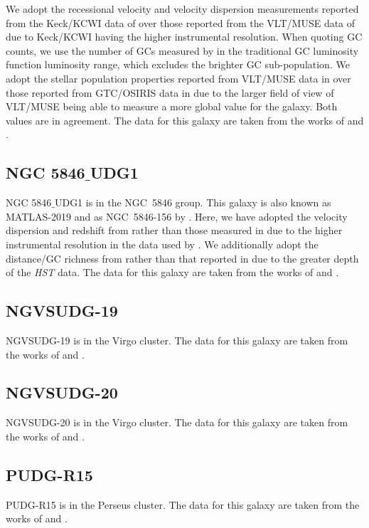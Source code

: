 We adopt the recessional velocity and velocity dispersion measurements reported from the Keck/KCWI data of \citet{Danieli2019} over those reported from the VLT/MUSE data of \citet{Emsellem2019} due to Keck/KCWI having the higher instrumental resolution. When quoting GC counts, we use the number of GCs measured by \citet{Shen2021} in the traditional GC luminosity function luminosity range, which excludes the brighter GC sub-population. We adopt the stellar population properties reported from VLT/MUSE data in \citet{Fensch2019} over those reported from GTC/OSIRIS data in \citet{RuizLara2019} due to the larger field of view of VLT/MUSE being able to measure a more global value for the galaxy. Both values are in agreement. The data for this galaxy are taken from the works of \citet{vanDokkum2018, Fensch2019, Danieli2019, Shen2021} and \citet{Shen2023}.

\subsection{NGC 5846$\_$UDG1}
NGC 5846$\_$UDG1 is in the NGC~5846 group. This galaxy is also known as MATLAS-2019 \citep{Muller2020} and as NGC~5846-156 by \citet{Mahdavi2005}. Here, we have adopted the velocity dispersion and redshift from \cite{Forbes2021} rather than those measured in \cite{Muller2020} due to the higher instrumental resolution in the data used by \citet{Forbes2021}. We additionally adopt the distance/GC richness from \cite{Danieli2022} rather than that reported in \cite{Muller2021} due to the greater depth of the \textit{HST} data. The data for this galaxy are taken from the works of \citet{Forbes2019, Muller2020, Muller2021, Forbes2021, Danieli2022} and \citet{FerreMateu2023}.

\subsection{NGVSUDG-19}
NGVSUDG-19 is in the Virgo cluster. The data for this galaxy are taken from the works of \citet{Lim2020} and \citet{Toloba2023}.

\subsection{NGVSUDG-20}
NGVSUDG-20 is in the Virgo cluster. The data for this galaxy are taken from the works of \citet{Lim2020} and \citet{Toloba2023}.

\subsection{PUDG-R15}
PUDG-R15 is in the Perseus cluster. The data for this galaxy are taken from the works of \citet{Gannon2022, Janssens2024} and \citet{FerreMateu2023}. 

